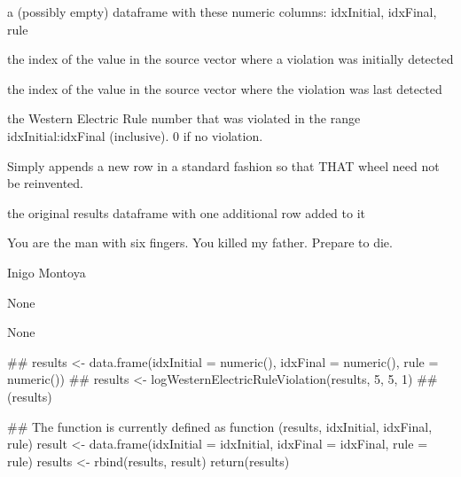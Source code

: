 \documentclass[a4paper]{book}
\begin{document}
%
\begin{Arguments}
\begin{ldescription}
\item[\code{results}] 
a (possibly empty) dataframe with these numeric columns:  idxInitial, idxFinal, rule

\item[\code{idxInitial}] 
the index of the value in the source vector where a violation was initially detected

\item[\code{idxFinal}] 
the index of the value in the source vector where the violation was last detected

\item[\code{rule}] 
the Western Electric Rule number that was violated in the range idxInitial:idxFinal (inclusive). 0 if no violation.

\end{ldescription}
\end{Arguments}
%
\begin{Details}\relax
Simply appends a new row in a standard fashion so that THAT wheel need not be reinvented.
\end{Details}
%
\begin{Value}
the original results dataframe with one additional row added to it
\end{Value}
%
\begin{Note}\relax
You are the man with six fingers.  You killed my father.  Prepare to die.
\end{Note}
%
\begin{Author}\relax
Inigo Montoya
\end{Author}
%
\begin{References}\relax
None
\end{References}
%
\begin{SeeAlso}\relax
None
\end{SeeAlso}
%
\begin{Examples}
\begin{ExampleCode}
## results <- data.frame(idxInitial = numeric(), idxFinal = numeric(), rule = numeric())
## results <- logWesternElectricRuleViolation(results, 5, 5, 1)
## (results)

## The function is currently defined as
function (results, idxInitial, idxFinal, rule) 
{
    result <- data.frame(idxInitial = idxInitial, idxFinal = idxFinal, 
        rule = rule)
    results <- rbind(results, result)
    return(results)
  }
\end{ExampleCode}
\end{Examples}
\end{document}
